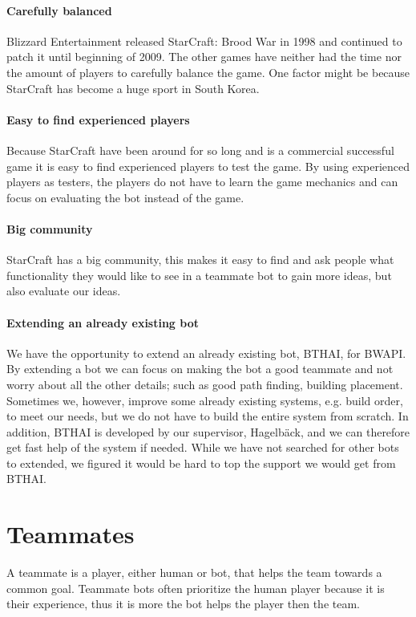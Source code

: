 \paragraph{Carefully balanced}
Blizzard Entertainment released StarCraft: Brood War in 1998 and continued to patch it until beginning of 2009.
The other games have neither had the time nor the amount of players to carefully balance the game. One factor might be because StarCraft has become a huge sport in South Korea\cite{scKotakuKorea}.

\paragraph{Easy to find experienced players}
Because StarCraft have been around for so long and is a commercial successful game it is easy to find experienced players to test the game. By using experienced players as testers, the players do not have to learn the game mechanics and can focus on evaluating the bot instead of the game.

\paragraph{Big community}
StarCraft has a big community, this makes it easy to find and ask people what functionality they would like to see in a teammate bot to gain more ideas, but also evaluate our ideas.

\paragraph{Extending an already existing bot} We have the opportunity to extend an already existing bot, BTHAI\cite{bthai}, for BWAPI\cite{bwapi}. By extending a bot we can focus on making the bot a good teammate and not worry about all the other details; such as good path finding, building placement. Sometimes we, however, improve some already existing systems, e.g. build order, to meet our needs, but we do not have to build the entire system from scratch. In addition, BTHAI is developed by our supervisor, Hagelbäck, and we can therefore get fast help of the system if needed. While we have not searched for other bots to extended, we figured it would be hard to top the support we would get from BTHAI.

\section{Teammates}
A teammate is a player, either human or bot, that helps the team towards a common goal. Teammate bots often prioritize the human player because it is their experience, thus it is more the bot helps the player then the team.

